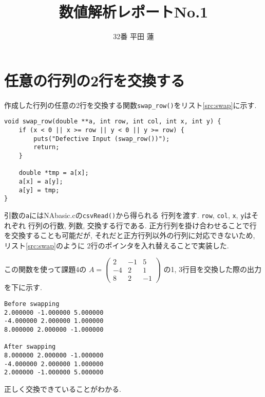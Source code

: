 \documentclass{jsarticle}
\title{数値解析レポートNo.1}
\author{32番 平田 蓮}
\date{}
\begin{document}
\maketitle
    \section{任意の行列の2行を交換する}
        作成した行列の任意の2行を交換する関数\verb|swap_row()|をリスト\ref{src:swap}に示す.

        \begin{lstlisting}[caption=swap.c, label=src:swap]
void swap_row(double **a, int row, int col, int x, int y) {
    if (x < 0 || x >= row || y < 0 || y >= row) {
        puts("Defective Input (swap_row())");
        return;
    }

    double *tmp = a[x];
    a[x] = a[y];
    a[y] = tmp;
}\end{lstlisting}

        引数の\verb|a|にはNAbasic.cの\verb|csvRead()|から得られる
        行列を渡す.
        \verb|row|, \verb|col|, \verb|x|, \verb|y|はそれぞれ
        行列の行数, 列数, 交換する行である.
        正方行列を掛け合わせることで行を交換することも可能だが,
        それだと正方行列以外の行列に対応できないため,
        リスト\ref{src:swap}のように
        2行のポインタを入れ替えることで実装した.

        この関数を使って課題4の
        $
            A = \left(
                \begin{array}{ccc}
                  2 & -1 & 5 \\
                  -4 & 2 & 1 \\
                  8 & 2 & -1
                \end{array}
            \right)
        $
        の1, 3行目を交換した際の出力を下に示す.

        \begin{verbatim}
Before swapping
2.000000 -1.000000 5.000000 
-4.000000 2.000000 1.000000 
8.000000 2.000000 -1.000000 

After swapping
8.000000 2.000000 -1.000000 
-4.000000 2.000000 1.000000 
2.000000 -1.000000 5.000000 
        \end{verbatim}

        正しく交換できていることがわかる.
\end{document}
